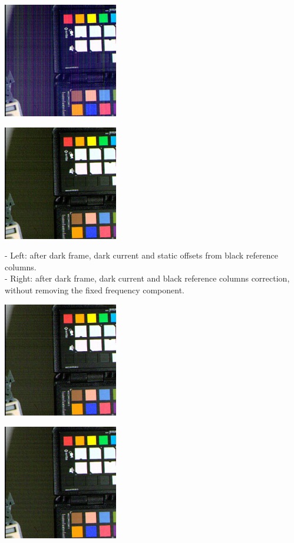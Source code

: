 \begin{center}
\includegraphics[height=5cm]{images/10ms+4-totally-raw-crop}
\end{center}

\begin{center}
\includegraphics[height=5cm]{images/10ms+4-no-blackcol-crop}
\end{center}

- Left: after dark frame, dark current and static offsets from black reference columns.\\
- Right: after dark frame, dark current and black reference columns correction, without removing the fixed frequency component.\\

 \begin{center}
\includegraphics[height=5cm]{images/10ms+4-no-blackcol-rn-crop}
\end{center}

\begin{center}
\includegraphics[height=5cm]{images/10ms+4-no-blackcol-ff-crop}
\end{center}

